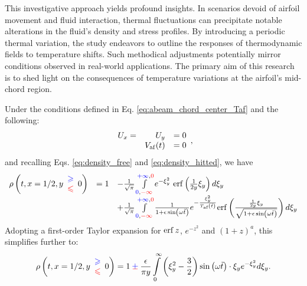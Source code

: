 This investigative approach yields profound insights. In scenarios devoid of airfoil movement and fluid interaction, thermal fluctuations can precipitate notable alterations in the fluid's density and stress profiles. By introducing a periodic thermal variation, the study endeavors to outline the responses of thermodynamic fields to temperature shifts. Such methodical adjustments potentially mirror conditions observed in real-world applications. The primary aim of this research is to shed light on the consequences of temperature variations at the airfoil's mid-chord region.

Under the conditions defined in Eq. \ref{eq:abeam_chord_center_Taf} and the following:
\begin{equation*}
\begin{array}{ r r l }
U_x = & U_y & =0\\
 & V_{\mathrm{af}} (t) & =0
\end{array}
,
\end{equation*}
and recalling Eqs. \ref{eq:density_free} and \ref{eq:density_hitted}, we have
\begin{equation*}
\begin{array}{ r l l }
\rho \left( t,x=1/2,y\begin{array}{ c }
\textcolor[rgb]{0,0,1}{\geqslant }\\
\textcolor[rgb]{1,0,0}{\leqslant }
\end{array} 0\right) & =1 & -\frac{1}{\sqrt{\pi }}\int\limits _{\textcolor[rgb]{0,0,1}{0} ,\textcolor[rgb]{1,0,0}{-\infty }}^{\textcolor[rgb]{0,0,1}{+\infty } ,\textcolor[rgb]{1,0,0}{0}} e^{-\xi _{y}^{2}}\,\erf\left(\frac{1}{2y} \xi _{y}\right) d\xi _{y}\\
 &  & +\frac{1}{\sqrt{\pi }}\int\limits _{\textcolor[rgb]{0,0,1}{0} ,\textcolor[rgb]{1,0,0}{-\infty }}^{\textcolor[rgb]{0,0,1}{+\infty } ,\textcolor[rgb]{1,0,0}{0}}\frac{1}{1+\epsilon \sin\left( \omega \tilde{t}\right)} e^{-\frac{\xi _{y}^{2}}{T_{\text{af}}\left(\tilde{t}\right)}}\mathrm{erf}\left(\frac{\frac{1}{2y} \xi _{y}}{\sqrt{1+\epsilon \sin\left( \omega \tilde{t}\right)}}\right) d\xi _{y}
\end{array}
\end{equation*}
Adopting a first-order Taylor expansion for $\operatorname{erf} z$, $e^{-z^2}$ and $(1+z)^a$, this simplifies further to:
\begin{equation}\label{eq:rho_before_Abramowitz}
\rho \left( t,x=1/2,y\begin{array}{ c }
\textcolor[rgb]{0,0,1}{\geqslant }\\
\textcolor[rgb]{1,0,0}{\leqslant }
\end{array} 0\right) =1\cpm \frac{\epsilon }{\pi y}\int\limits _{0}^{\infty }\left( \xi _{y}^{2} -\frac{3}{2}\right)\sin\left( \omega \tilde{t}\right) \cdot \xi _{y} e^{-\xi _{y}^{2}} d\xi _{y}
.
\end{equation}
